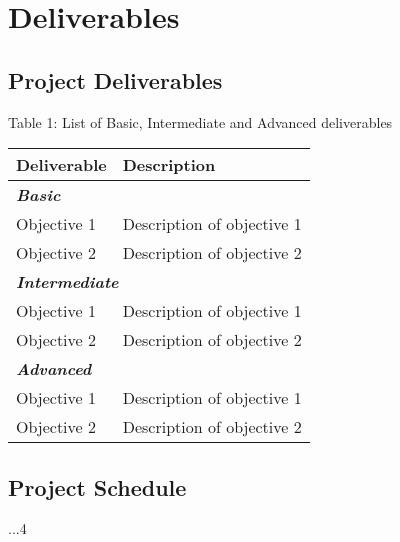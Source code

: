 \documentclass[12pt,a4paper]{article}
\begin{document}
\newpage

\section{Deliverables}
\subsection{Project Deliverables}
\begin{center}
	Table 1: List of Basic, Intermediate and Advanced deliverables
\end{center}
\begin{tabular}{p{5cm}p{10cm}}
	\hline
	\textbf{Deliverable} & \textbf{Description}\\
	\hline\hline
	\multicolumn{2}{l}{\textit{\textbf{Basic}}} \\
	\hline
	Objective 1   &  Description of objective 1\\
	Objective 2   &  Description of objective 2\\
	\hline \hline
	\multicolumn{2}{l}{\textit{\textbf{Intermediate}}} \\
	\hline
	Objective 1   &  Description of objective 1\\
	Objective 2   &  Description of objective 2\\
	\hline \hline
	\multicolumn{2}{l}{\textit{\textbf{Advanced}}} \\
	\hline
	Objective 1   &  Description of objective 1\\
	Objective 2   &  Description of objective 2\\
	\hline
\end{tabular}

\subsection{Project Schedule}
...4 

\newpage
\end{document}
